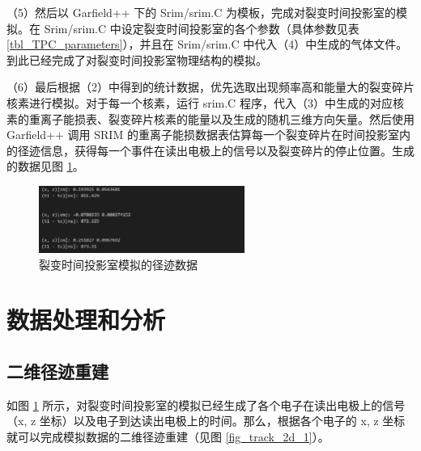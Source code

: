 \documentclass[AutoFakeBold]{LZUThesis}
\begin{document}
（5）然后以 Garfield++ 下的 Srim/srim.C 为模板，完成对裂变时间投影室的模拟。在 Srim/srim.C 中设定裂变时间投影室的各个参数（具体参数见表 \ref{tbl_TPC_parameters}），并且在 Srim/srim.C 中代入（4）中生成的气体文件。到此已经完成了对裂变时间投影室物理结构的模拟。

（6）最后根据（2）中得到的统计数据，优先选取出现频率高和能量大的裂变碎片核素进行模拟。对于每一个核素，运行 srim.C 程序，代入（3）中生成的对应核素的重离子能损表、裂变碎片核素的能量以及生成的随机三维方向矢量。然后使用 Garfield++ 调用 SRIM 的重离子能损数据表估算每一个裂变碎片在时间投影室内的径迹信息，获得每一个事件在读出电极上的信号以及裂变碎片的停止位置。生成的数据见图 \ref{fig_output}。

\begin{figure}[H]
    \centering
    \includegraphics[width=0.6\textwidth]{figures/output.png}
    \caption{裂变时间投影室模拟的径迹数据}
    \label{fig_output}
\end{figure}




\section{数据处理和分析}
\subsection{二维径迹重建}
\label{sub:二维径迹重建}
如图 \ref{fig_output} 所示，对裂变时间投影室的模拟已经生成了各个电子在读出电极上的信号（x, z 坐标）以及电子到达读出电极上的时间。那么，根据各个电子的 x, z 坐标就可以完成模拟数据的二维径迹重建（见图 \ref{fig_track_2d_1}）。
\end{document}

